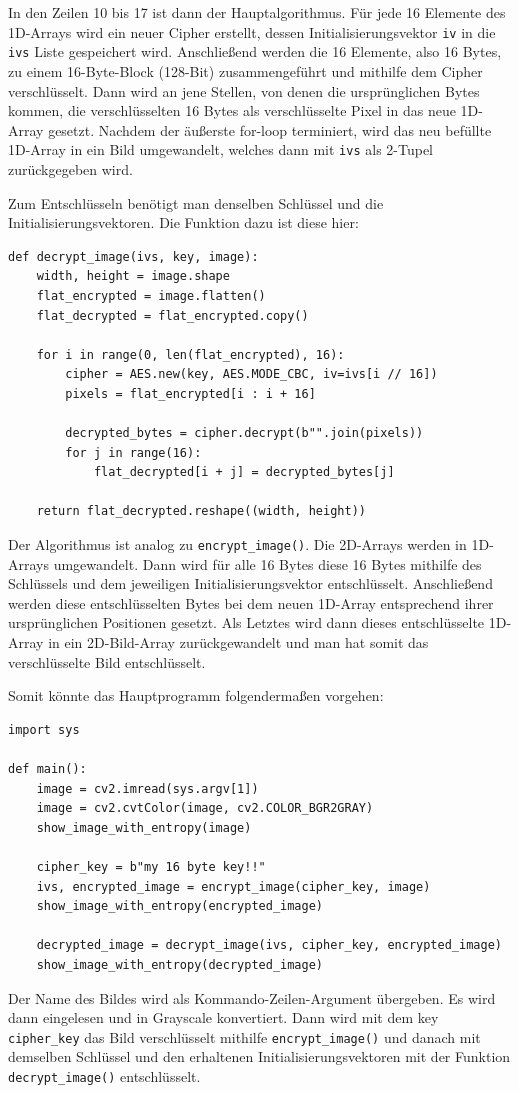 In den Zeilen 10 bis 17 ist dann der Hauptalgorithmus. Für jede 16 Elemente des 1D-Arrays wird ein neuer Cipher erstellt,
dessen Initialisierungsvektor \lstinline{iv} in die \lstinline{ivs} Liste gespeichert wird. Anschließend werden die 16 Elemente,
also 16 Bytes, zu einem 16-Byte-Block (128-Bit) zusammengeführt und mithilfe dem Cipher verschlüsselt.
Dann wird an jene Stellen, von denen die ursprünglichen Bytes kommen, die verschlüsselten
16 Bytes als verschlüsselte Pixel in das neue 1D-Array gesetzt. Nachdem der äußerste for-loop terminiert, wird das neu befüllte 1D-Array in ein
Bild umgewandelt, welches dann mit \lstinline{ivs} als 2-Tupel zurückgegeben wird.

Zum Entschlüsseln benötigt man denselben Schlüssel und die Initialisierungsvektoren. Die Funktion dazu ist diese hier:
\begin{lstlisting}
def decrypt_image(ivs, key, image):
    width, height = image.shape
    flat_encrypted = image.flatten()
    flat_decrypted = flat_encrypted.copy()

    for i in range(0, len(flat_encrypted), 16):
        cipher = AES.new(key, AES.MODE_CBC, iv=ivs[i // 16])
        pixels = flat_encrypted[i : i + 16]

        decrypted_bytes = cipher.decrypt(b"".join(pixels))
        for j in range(16):
            flat_decrypted[i + j] = decrypted_bytes[j]

    return flat_decrypted.reshape((width, height))
\end{lstlisting}
Der Algorithmus ist analog zu \lstinline{encrypt_image()}. Die 2D-Arrays werden in 1D-Arrays umgewandelt. Dann wird für alle
16 Bytes diese 16 Bytes mithilfe des Schlüssels und dem jeweiligen Initialisierungsvektor entschlüsselt. Anschließend werden diese entschlüsselten Bytes
bei dem neuen 1D-Array entsprechend ihrer ursprünglichen Positionen gesetzt. Als Letztes wird dann dieses entschlüsselte 1D-Array
in ein 2D-Bild-Array zurückgewandelt und man hat somit das verschlüsselte Bild entschlüsselt.

Somit könnte das Hauptprogramm folgendermaßen vorgehen:
\begin{lstlisting}
import sys

def main():
    image = cv2.imread(sys.argv[1])
    image = cv2.cvtColor(image, cv2.COLOR_BGR2GRAY)
    show_image_with_entropy(image)

    cipher_key = b"my 16 byte key!!"
    ivs, encrypted_image = encrypt_image(cipher_key, image)
    show_image_with_entropy(encrypted_image)

    decrypted_image = decrypt_image(ivs, cipher_key, encrypted_image)
    show_image_with_entropy(decrypted_image)
\end{lstlisting}
Der Name des Bildes wird als Kommando-Zeilen-Argument übergeben. Es wird dann eingelesen und in Grayscale konvertiert.
Dann wird mit dem key \lstinline{cipher_key} das Bild verschlüsselt mithilfe \lstinline{encrypt_image()} und danach
mit demselben Schlüssel und den erhaltenen Initialisierungsvektoren mit der Funktion \lstinline{decrypt_image()} entschlüsselt.

